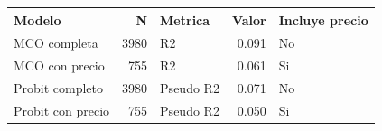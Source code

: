 \begin{tabular}{lrlrl}
\toprule
Modelo & N & Metrica & Valor & Incluye precio \\
\midrule
MCO completa & 3980 & R2 & 0.091 & No \\
MCO con precio & 755 & R2 & 0.061 & Si \\
Probit completo & 3980 & Pseudo R2 & 0.071 & No \\
Probit con precio & 755 & Pseudo R2 & 0.050 & Si \\
\bottomrule
\end{tabular}
